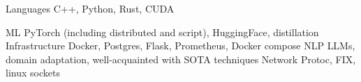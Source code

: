 
\begin{cvskills}
  \cvskill
    {Languages} %
    {C++, Python, Rust, CUDA} %

  \cvskill
    {ML} %
    {PyTorch (including distributed and script), HuggingFace, distillation} %
  \cvskill
    {Infrastructure}
    {Docker, Postgres, Flask, Prometheus, Docker compose}
  \cvskill
    {NLP}
    {LLMs, domain adaptation, well-acquainted with SOTA techniques}
  \cvskill
    {Network}
    {Protoc, FIX, linux sockets}
\end{cvskills}
